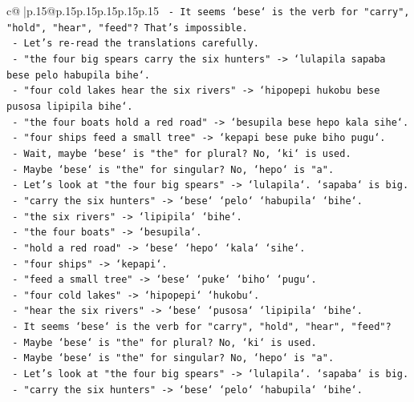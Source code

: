 \documentclass{article}
\begin{document}
{\begin{supertabular}{c@{$\;$}|p{.15\linewidth}@{}p{.15\linewidth}p{.15\linewidth}p{.15\linewidth}p{.15\linewidth}p{.15\linewidth}}
{{{\texttt{    {-} It seems `bese` is the verb for "carry", "hold", "hear", "feed"? That's impossible.} \\
\texttt{    {-} Let's re{-}read the translations carefully.} \\
\texttt{    {-} "the four big spears carry the six hunters" {-}> `lulapila sapaba bese pelo habupila bihe`.} \\
\texttt{    {-} "four cold lakes hear the six rivers" {-}> `hipopepi hukobu bese pusosa lipipila bihe`.} \\
\texttt{    {-} "the four boats hold a red road" {-}> `besupila bese hepo kala sihe`.} \\
\texttt{    {-} "four ships feed a small tree" {-}> `kepapi bese puke biho pugu`.} \\
\texttt{    {-} Wait, maybe `bese` is "the" for plural? No, `ki` is used.} \\
\texttt{    {-} Maybe `bese` is "the" for singular? No, `hepo` is "a".} \\
\texttt{    {-} Let's look at "the four big spears" {-}> `lulapila`. `sapaba` is big.} \\
\texttt{    {-} "carry the six hunters" {-}> `bese` `pelo` `habupila` `bihe`.} \\
\texttt{    {-} "the six rivers" {-}> `lipipila` `bihe`.} \\
\texttt{    {-} "the four boats" {-}> `besupila`.} \\
\texttt{    {-} "hold a red road" {-}> `bese` `hepo` `kala` `sihe`.} \\
\texttt{    {-} "four ships" {-}> `kepapi`.} \\
\texttt{    {-} "feed a small tree" {-}> `bese` `puke` `biho` `pugu`.} \\
\texttt{    {-} "four cold lakes" {-}> `hipopepi` `hukobu`.} \\
\texttt{    {-} "hear the six rivers" {-}> `bese` `pusosa` `lipipila` `bihe`.} \\
\texttt{    {-} It seems `bese` is the verb for "carry", "hold", "hear", "feed"?} \\
\texttt{    {-} Maybe `bese` is "the" for plural? No, `ki` is used.} \\
\texttt{    {-} Maybe `bese` is "the" for singular? No, `hepo` is "a".} \\
\texttt{    {-} Let's look at "the four big spears" {-}> `lulapila`. `sapaba` is big.} \\
\texttt{    {-} "carry the six hunters" {-}> `bese` `pelo` `habupila` `bihe`.} \\
}}}
\end{supertabular}}
\end{document}
